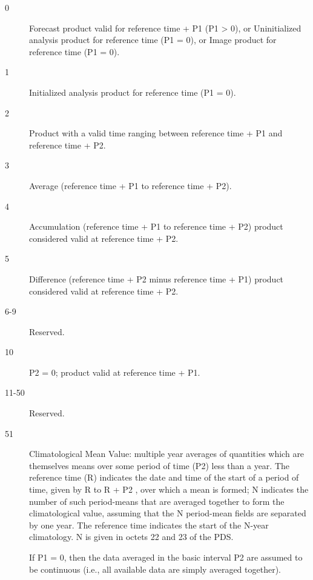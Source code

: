 \documentclass[draft,12pt,a4paper,twoside]{book}
\begin{document}
\begin{description}
\item [0]
  Forecast product valid for reference time + P1 (P1 > 0), or Uninitialized
  analysis product for reference time (P1 = 0), or Image product for reference
  time (P1 = 0).
\item [1]
  Initialized analysis product for reference time (P1 = 0).
\item [2]
  Product with a valid time ranging between reference time + P1 and reference time + P2.
\item [3]
  Average (reference time + P1  to reference time + P2).
\item [4]
  Accumulation (reference time + P1 to reference time + P2) product
  considered valid at reference time + P2.
\item [5]
  Difference (reference time + P2 minus reference time + P1) product
  considered valid at reference time + P2.
\item [6-9] Reserved.
\item [10]
  P2 = 0; product valid at reference time + P1.
\item [11-50] Reserved.
\item [51]
  Climatological Mean Value: multiple year averages of quantities which are
  themselves means over some period of time (P2) less than a year. The
  reference time (R) indicates the date and time of the start of a period of
  time, given by R to R + P2 , over which a mean is formed; N indicates the
  number of such period-means that are averaged together to form the
  climatological value, assuming that the N period-mean fields are separated by
  one year. The reference time indicates the start of the N-year climatology. N
  is given in octets 22 and 23 of the PDS.

  If P1 = 0, then the data averaged in the basic interval P2 are assumed to be
  continuous (i.e., all available data are simply averaged together).


\end{description}
\end{document}
